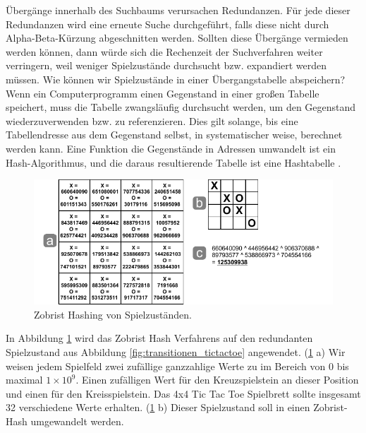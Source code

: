 Übergänge innerhalb des Suchbaums verursachen Redundanzen. Für jede dieser Redundanzen wird eine erneute Suche durchgeführt, falls diese nicht durch Alpha-Beta-Kürzung abgeschnitten werden. Sollten diese Übergänge vermieden werden können, dann würde sich die Rechenzeit der Suchverfahren weiter verringern, weil weniger Spielzustände durchsucht bzw. expandiert werden müssen. Wie können wir Spielzustände in einer Übergangstabelle abspeichern? \\

Wenn ein Computerprogramm einen Gegenstand in einer großen Tabelle speichert, muss die Tabelle zwangsläufig durchsucht werden, um den Gegenstand wiederzuverwenden bzw. zu referenzieren. Dies gilt solange, bis eine Tabellendresse aus dem Gegenstand selbst, in systematischer weise, berechnet werden kann. Eine Funktion die Gegenstände in Adressen umwandelt ist ein Hash-Algorithmus, und die daraus resultierende Tabelle ist eine Hashtabelle \cite[3]{Zobrist}. \\

\begin{figure}[!htbp]
  \centering
  \includegraphics[scale = 1.3]{inhalt/abbildungen/zobrist_hash_tictactoe.pdf}
  \caption{Zobrist Hashing von Spielzuständen.}
  \label{fig:zobrist_hash_tictactoe}
\end{figure} 


In Abbildung \ref{fig:zobrist_hash_tictactoe} wird das Zobrist Hash Verfahrens auf den redundanten Spielzustand aus Abbildung \ref{fig:transitionen_tictactoe} angewendet. (\ref{fig:zobrist_hash_tictactoe} a) Wir weisen jedem Spielfeld zwei zufällige ganzzahlige Werte zu im Bereich von 0 bis maximal $1 \times 10^{9}$. Einen zufälligen Wert für den Kreuzspielstein an dieser Position und einen für den Kreisspielstein. Das 4x4 Tic Tac Toe Spielbrett sollte insgesamt 32 verschiedene Werte erhalten. (\ref{fig:zobrist_hash_tictactoe} b) Dieser Spielzustand soll in einen Zobrist-Hash umgewandelt werden. \\

